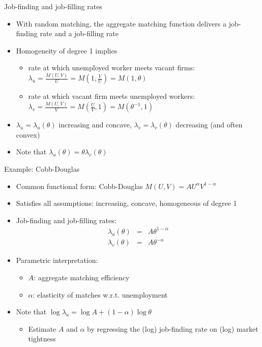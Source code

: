 \documentclass[9pt]{beamer}
\newcommand{\bit}{\begin{itemize}}
\newcommand{\eit}{\end{itemize}}
\begin{document}
\begin{frame}{Job-finding and job-filling rates}

\bit
\setlength\itemsep{2em}

\item With random matching, the aggregate matching function delivers a job-finding rate and a job-filling rate

\item Homogeneity of degree 1 implies
\bit
\setlength\itemsep{0.5em}
\item rate at which unemployed worker meets vacant firms: $\lambda_u=\frac{M(U,V)}{U} = M(1, \frac{V}{U}) = M(1, \theta)$
\item rate at which vacant firm meets unemployed workers: $\lambda_v=\frac{M(U,V)}{V} = M(\frac{U}{V},1) = M(\theta^{-1},1)$
\eit

\item $\lambda_u=\lambda_u(\theta)$ increasing and concave, $\lambda_v=\lambda_v(\theta)$ decreasing (and often convex)

\item Note that $\lambda_u(\theta) = \theta \lambda_v(\theta)$


\eit
\end{frame}


\begin{frame}{Example: Cobb-Douglas}

\bit
\setlength\itemsep{2em}

\item Common functional form: Cobb-Douglas $M(U,V) = AU^{\alpha}V^{1-\alpha}$

\item Satisfies all assumptions: increasing, concave, homogeneous of degree 1

\item Job-finding and job-filling rates:
\begin{eqnarray}
\lambda_u(\theta) &=& A \theta^{1-\alpha} \nonumber \\
\lambda_v(\theta) &=& A \theta^{-\alpha} \nonumber
\end{eqnarray}

\item Parametric interpretation:
\bit
	\item $A$: aggregate matching efficiency
	
	\item $\alpha$: elasticity of matches w.r.t. unemployment
\eit

\item Note that $\log \lambda_u = \log A + (1-\alpha) \log \theta$
\bit
\item Estimate $A$ and $\alpha$ by regressing the (log) job-finding rate on (log) market tightness
\eit

\eit
\end{frame}
\end{document}
